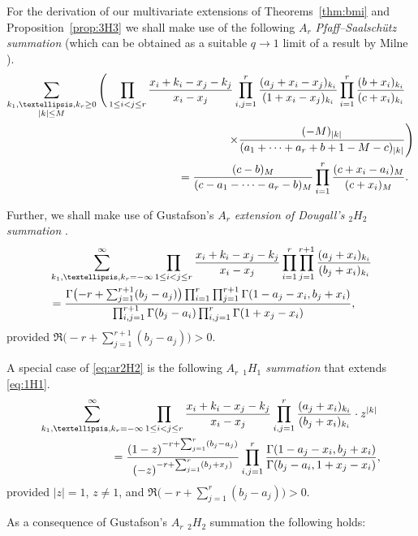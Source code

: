 \documentclass[reqno,12pt]{amsart}
\theoremstyle{remark}
\numberwithin{equation}{section}
\begin{document}
For the derivation of our multivariate extensions of
Theorems~\ref{thm:bmi} and Proposition~\ref{prop:3H3} we shall
make use of the following \textit{$A_r$ Pfaff--Saalsch\"utz summation}
(which can be obtained as a suitable $q\to 1$ limit of a result by
Milne \cite[Theorem~4.15]{M2}).
\begin{align}\label{eq:ar3F2}
\sum_{\substack{k_1,\dots,k_r\ge0\\|k|\le M}}\Bigg(
\prod_{1\le i<j\le r}\frac{x_i+k_i-x_j-k_j}{x_i-x_j}
\prod_{i,j=1}^r\frac{(a_j+x_i-x_j)_{k_i}}{(1+x_i-x_j)_{k_i}}
\prod_{i=1}^r\frac{(b+x_i)_{k_i}}{(c+x_i)_{k_i}}&\notag\\
\times
\frac{(-M)_{|k|}}{(a_1+\cdots+a_r+b+1-M-c)_{|k|}}&\Bigg)\notag\\
=\frac{(c-b)_M}{(c-a_1-\cdots-a_r-b)_M}
\prod_{i=1}^r\frac{(c+x_i-a_i)_M}{(c+x_i)_M}&.
\end{align}

Further, we shall make use of Gustafson's
\textit{$A_r$ extension of Dougall's ${}_2H_2$ summation}
\cite[Theorem~1.11]{G}.
\begin{align}\label{eq:ar2H2}
&\sum_{k_1,\dots,k_r=-\infty}^\infty
\prod_{1\le i<j\le r}\frac{x_i+k_i-x_j-k_j}{x_i-x_j}
\prod_{i=1}^r\prod_{j=1}^{r+1}\frac{(a_j+x_i)_{k_i}}{(b_j+x_i)_{k_i}}\notag\\
&=\frac{\Gamma\big({-}r+\sum_{j=1}^{r+1}(b_j-a_j)\big)
\prod_{i=1}^r\prod_{j=1}^{r+1}\Gamma(1-a_j-x_i,b_j+x_i)}
{\prod_{i,j=1}^{r+1}\Gamma(b_j-a_i)
\prod_{i,j=1}^{r}\Gamma(1+x_j-x_i)},
\end{align}
provided $\Re\big({-}r+\sum_{j=1}^{r+1}(b_j-a_j)\big)>0$.

A special case of \eqref{eq:ar2H2}
is the following \textit{$A_r$ ${}_1H_1$ summation}
that extends \eqref{eq:1H1}.
\begin{align}
\sum_{k_1,\dots,k_r=-\infty}^\infty
\prod_{1\le i<j\le r}\frac{x_i+k_i-x_j-k_j}{x_i-x_j}
\prod_{i,j=1}^r\frac{(a_j+x_i)_{k_i}}{(b_j+x_i)_{k_i}}
\cdot z^{|k|}&\notag\\
=\frac{(1-z)^{-r+\sum_{j=1}^r(b_j-a_j)}}{(-z)^{{-}r+\sum_{j=1}^r(b_j+x_j)}}
\prod_{i,j=1}^r\frac{\Gamma(1-a_j-x_i,b_j+x_i)}
{\Gamma(b_j-a_i,1+x_j-x_i)}&,
\end{align}
provided $|z|=1$, $z\ne 1$, and $\Re\big({-}r+\sum_{j=1}^{r}(b_j-a_j)\big)>0$.

As a consequence of Gustafson's $A_r$ ${}_2H_2$ summation the following holds:
\end{document}
